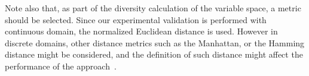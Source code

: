 Note also that, as part of the diversity calculation of the variable space, a metric should be selected.
%
Since our experimental validation is performed with continuous domain, the normalized Euclidean distance is used.
%
However in discrete domains, other distance metrics such as the Manhattan, or the Hamming distance might be considered, and the definition of
such distance might affect the performance of the approach~\cite{Segura:17}.


%
%
%

%
%
%

%
%
%
%
%
%
%

%
%
%
%


